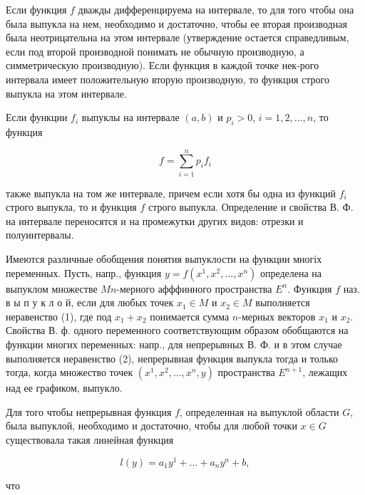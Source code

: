 \documentclass[10pt]{article}
\begin{document}
Если функция $f$ дважды дифференцируема на интервале, то для того чтобы она была выпукла на нем, необходимо и достаточно, чтобы ее вторая производная была неотрицательна на этом интервале (утверждение остается справедливым, если под второй производной понимать не обычную производную, а симметрическую производную). Если функция в каждой точке нек-рого интервала имеет положительную вторую производную, то функция строго выпукла на этом интервале.



Если функции $f_{i}$ выпуклы на интервале $(a, b)$ и $p_{i}>0$, $i=1,2, \ldots, n$, то функция



\[

f=\sum_{i=1}^{n} p_{i} f_{i}

\]



также выпукла на том же интервале, причем если хотя бы одна из функций $f_{i}$ строго выпукла, то и функция $f$ строго выпукла. Определение и свойства В. Ф. на интервале переносятся и на промежутки других видов: отрезки и полуинтервалы.



Имеются различные обобщения понятия выпуклости на функции многіх переменных. Пусть, напр., функция $y=f\left(x^{1}, x^{2}, \ldots, x^{n}\right)$ определена на выпуклом множестве $M n$-мерного афффинного пространства $E^{n}$. Функция $f$ наз. в ы п у к л о й, если для любых точек $x_{1} \in M$ и $x_{2} \in M$ выполняется неравенство (1), где под $x_{1}+x_{2}$ понимается сумма $n$-мерных векторов $x_{1}$ и $x_{2}$. Свойства В. ф. одного переменного соответствующим образом обобщаются на функции многих переменных: напр., для непрерывных В. Ф. и в этом случае выполняется неравенство (2), непрерывная функция выпукла тогда и только тогда, когда множество точек $\left(x^{1}, x^{2}, \ldots, x^{n}, y\right)$ пространства $E^{n+1}$, лежащих над ее графиком, выпукло.



Для того чтобы непрерывная функция $f$, определенная на выпуклой области $G$, была выпуклой, необходимо и достаточно, чтобы для любой точки $x \in G$ существовала такая линейная функция



\[

l(y)=a_{1} y^{1}+\ldots+a_{n} y^{n}+b,

\]



что
\end{document}
